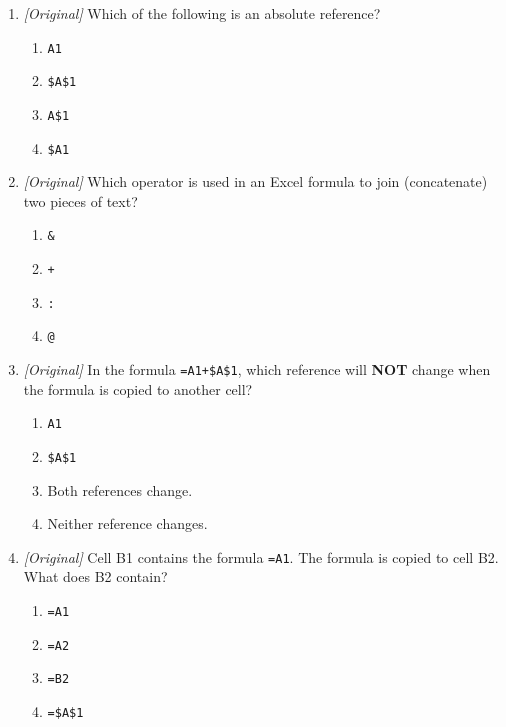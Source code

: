 \documentclass[11pt]{article}
\begin{document}
\begin{enumerate}[label=\textbf{Q\arabic*.}, leftmargin=*]
  begin with which character?
  \begin{enumerate}[label=\Alph*.]
    \item \texttt{+}
    \item \texttt{=}
    \item \texttt{@}
    \item \texttt{\#}
  \end{enumerate}
\item \textit{[Original]} Which of the following is an absolute reference?
  \begin{enumerate}[label=\Alph*.]
    \item \texttt{A1}
    \item \texttt{\$A\$1}
    \item \texttt{A\$1}
    \item \texttt{\$A1}
  \end{enumerate}
\item \textit{[Original]} Which operator is used in an Excel formula to join
  (concatenate) two pieces of text?
  \begin{enumerate}[label=\Alph*.]
    \item \texttt{\&}
    \item \texttt{+}
    \item \texttt{:}
    \item \texttt{@}
  \end{enumerate}
\item \textit{[Original]} In the formula \texttt{=A1+\$A\$1}, which reference
  will \textbf{NOT} change when the formula is copied to another cell?
  \begin{enumerate}[label=\Alph*.]
    \item \texttt{A1}
    \item \texttt{\$A\$1}
    \item Both references change.
    \item Neither reference changes.
  \end{enumerate}
\item \textit{[Original]} Cell B1 contains the formula \texttt{=A1}. The
  formula is copied to cell B2. What does B2 contain?
  \begin{enumerate}[label=\Alph*.]
    \item \texttt{=A1}
    \item \texttt{=A2}
    \item \texttt{=B2}
    \item \texttt{=\$A\$1}
  \end{enumerate}

\end{enumerate}
\end{document}

